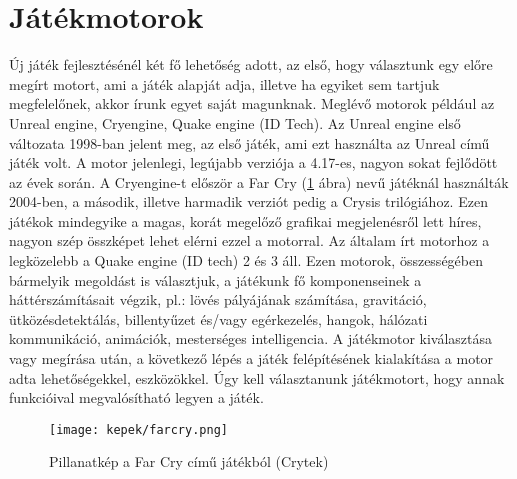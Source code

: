 \label{Chap:problemakor}








\section{Játékmotorok}

Új játék fejlesztésénél két fő lehetőség adott, az első, hogy választunk egy előre megírt motort, ami a játék alapját adja, illetve ha egyiket sem tartjuk megfelelőnek, akkor írunk egyet saját magunknak. Meglévő motorok például az Unreal engine, Cryengine, Quake engine (ID Tech). Az Unreal engine első változata 1998-ban jelent meg, az első játék, ami ezt használta az Unreal című játék volt. A motor jelenlegi, legújabb verziója a 4.17-es, nagyon sokat fejlődött az évek során. A Cryengine-t először a Far Cry (\ref{fig:farcry} ábra) nevű játéknál használták 2004-ben, a második, illetve harmadik verziót pedig a Crysis trilógiához. Ezen játékok mindegyike a magas, korát megelőző grafikai megjelenésről lett híres, nagyon szép összképet lehet elérni ezzel a motorral. Az általam írt motorhoz a legközelebb a Quake engine (ID tech) 2 és 3 áll.  Ezen motorok, összességében bármelyik megoldást is választjuk, a játékunk fő komponenseinek a háttérszámításait végzik, pl.: lövés pályájának számítása, gravitáció, ütközésdetektálás, billentyűzet és/vagy egérkezelés, hangok, hálózati kommunikáció, animációk, mesterséges intelligencia. A játékmotor kiválasztása vagy megírása után, a következő lépés a játék felépítésének kialakítása a motor adta lehetőségekkel, eszközökkel. Úgy kell választanunk játékmotort, hogy annak funkcióival megvalósítható legyen a játék.

\begin{figure}[h]
\centering
\texttt{[image: kepek/farcry.png]}
\caption{Pillanatkép a Far Cry című játékból (Crytek)}
\label{fig:farcry}
\end{figure}

